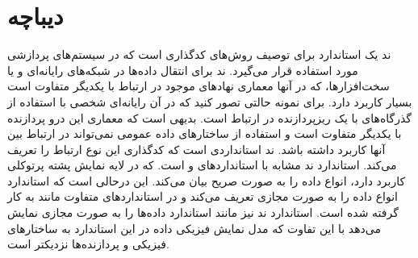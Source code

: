 
\chapter{دیباچه}


ند یک استاندارد برای توصیف روش‌های کدگذاری است که در سیستم‌های پردازشی مورد
استفاده قرار می‌گیرد.
ند برای انتقال داده‌ها در شبکه‌های رایانه‌ای و یا سخت‌افزارها، که در آنها معماری
نهادهای موجود در ارتباط با یکدیگر متفاوت است بسیار کاربرد دارد.
برای نمونه حالتی تصور کنید که در آن رایانه‌ای شخصی با استفاده از گذرگاه‌های
 با یک ریزپردازنده در ارتباط است. 
بدیهی است که معماری این درو پردازنده با یکدیگر متفاوت است و استفاده از ساختارهای
داده عمومی نمی‌تواند در ارتباط بین آنها کاربرد داشته باشد.
ند استانداردی است که کدگذاری این نوع ارتباط را تعریف می‌کند.
استاندارد ند مشابه با استانداردهای \cite{srinivasan1995xdr} و \cite{x409}
است.
 که در لایه نمایش پشته پرتوکلی  کاربرد دارد، انواع داده را به
صورت صریح بیان می‌کند.
این درحالی است که استاندارد  انواع داده را به صورت مجازی تعریف می‌کند و
در استانداردهای متفاوت مانند  به کار گرفته شده است.
استاندارد ند نیز مانند استاندارد  داده‌ها را به صورت مجازی نمایش می‌دهد
با این تفاوت که مدل نمایش فیزیکی داده در این استاندارد به ساختارهای فیزیکی و
پردازنده‌ها نزدیکتر است.


